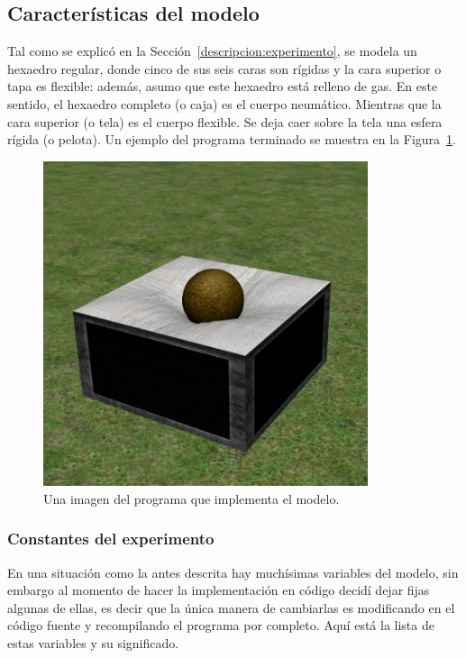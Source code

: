 \subsection{Características del modelo}
Tal como se explicó en la Sección~\ref{descripcion:experimento}, se modela un hexaedro regular, donde cinco de sus seis caras son rígidas y la cara superior o tapa es flexible: además, asumo que este hexaedro está relleno de gas.
En este sentido, el hexaedro completo (o caja) es el cuerpo neumático.
Mientras que la cara superior (o tela) es el cuerpo flexible.
Se deja caer sobre la tela una esfera rígida (o pelota).
Un ejemplo del programa terminado se muestra en la Figura~\ref{programa:portada}.
\begin{figure}
 \centering
 \includegraphics[width=0.85\textwidth]{img/04/modeloPortada}
 \caption[Ejemplo del programa en ejecución]{Una imagen del programa que implementa el modelo.}
 \label{programa:portada}
\end{figure}

\subsubsection{Constantes del experimento}
En una situación como la antes descrita hay muchísimas variables del modelo, sin embargo al momento de hacer la implementación en código decidí dejar fijas algunas de ellas, es decir que la única manera de cambiarlas es modificando en el código fuente y recompilando el programa por completo.
Aquí está la lista de estas variables y su significado.

